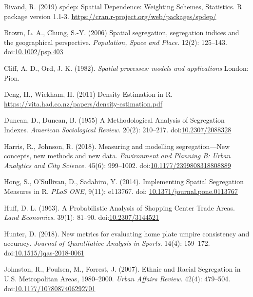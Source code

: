 \documentclass{article}
\theoremstyle{theorem}
\theoremstyle{definition}
\begin{document}
\begin{thebibliography}{3}

 Bivand, R. (2019) spdep: Spatial Dependence: Weighting Schemes, Statistics. R package version 1.1-3. \href{https://cran.r-project.org/web/packages/spdep}{\url{https://cran.r-project.org/web/packages/spdep/}}

Brown, L. A., Chung, S.-Y. (2006) Spatial segregation, segregation indices and the geographical perspective. \textit{Population, Space and Place.} 12(2): 125--143. doi:\href{https://doi.org/10.1002/psp.403}{10.1002/psp.403}

Cliff, A. D., Ord, J. K. (1982). \textit{Spatial processes: models and applications} London: Pion.

 Deng, H., Wickham, H. (2011) Density Estimation in R. \href{https://vita.had.co.nz/papers/density-estimation.pdf}{\url{https://vita.had.co.nz/papers/density-estimation.pdf}}

 Duncan, D., Duncan, B. (1955) A Methodological Analysis of Segregation Indexes. \textit{American Sociological Review.} 20(2): 210--217. doi:\href{http://dx.doi.org/10.2307/2088328}{10.2307/2088328}

Harris, R., Johnson, R. (2018). Measuring and modelling segregation---New concepts, new methods and new data. \textit{Environment and Planning B: Urban Analytics and City Science.} 45(6): 999--1002. doi:\href{http://dx.doi.org/10.1177/2399808318808889}{10.1177/2399808318808889}

 Hong, S., O'Sullivan, D., Sadahiro, Y. (2014). Implementing Spatial Segregation Measures in R. \textit{PLoS ONE}, 9(11): e113767. doi: \href{http://dx.doi.org/10.1371/journal.pone.0113767}{10.1371/journal.pone.0113767}

 Huff, D. L. (1963). A Probabilistic Analysis of Shopping Center Trade Areas. \textit{Land Economics.} 39(1): 81--90. doi:\href{https://doi.org/10.2307/3144521}{10.2307/3144521}

 Hunter, D. (2018). New metrics for evaluating home plate umpire consistency and accuracy. \textit{Journal of Quantitative Analysis in Sports.} 14(4): 159--172. doi:\href{http://dx.doi.org/10.1515/jqas-2018-0061}{10.1515/jqas-2018-0061}

Johnston, R., Poulsen, M., Forrest, J. (2007). Ethnic and Racial Segregation in U.S. Metropolitan Areas, 1980--2000. \textit{Urban Affairs Review.} 42(4): 479--504. doi:\href{https://doi.org/10.1177/1078087406292701}{10.1177/1078087406292701}


\end{thebibliography}
\end{document}
